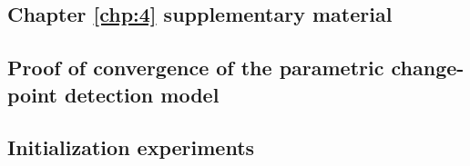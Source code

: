\begin{appendices}
\chapter{Chapter \ref{chp:4} supplementary material} \label{app:chap4}

\section{Proof of convergence of the parametric change-point detection model}

\section{Initialization experiments}

\end{appendices}